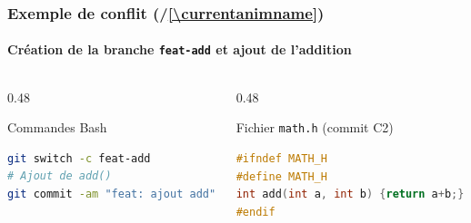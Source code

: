 \documentclass[
	11pt,
	aspectratio=169
]{beamer}
\newcounter{animstep}
\newcommand{\stepanim}{%
    \stepcounter{animstep}%
    (\theanimstep/\ref*{\currentanimname})%
}
\begin{document}
\begin{frame}[fragile]
    \frametitle{Exemple de conflit \stepanim}
    \framesubtitle{Création de la branche \texttt{feat-add} et ajout de l'addition}

    \begin{center}
    \end{center}
    \vspace{-0.3cm}

    \begin{columns}[t]
        \begin{column}{0.48\textwidth}
            \begin{block}{\scriptsize Commandes Bash}
\begin{lstlisting}[language=bash]
git switch -c feat-add
# Ajout de add()
git commit -am "feat: ajout add"
\end{lstlisting}
            \end{block}
        \end{column}
        \begin{column}{0.48\textwidth}
            \begin{exampleblock}{\scriptsize Fichier \texttt{math.h} (commit C2)}
\begin{lstlisting}[language=C]
#ifndef MATH_H
#define MATH_H
int add(int a, int b) {return a+b;}
#endif
\end{lstlisting}
            \end{exampleblock}
        \end{column}
    \end{columns}
\end{frame}
\end{document}
